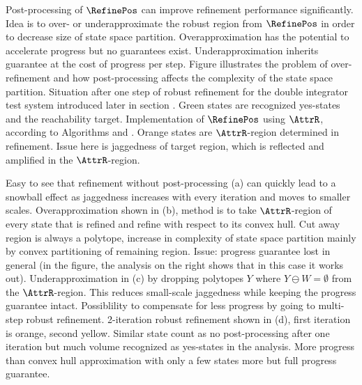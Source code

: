     Post-processing of $\RefinePos$ can improve refinement performance significantly.
    Idea is to over- or underapproximate the robust region from $\RefinePos$ in order to decrease size of state space partition.
    Overapproximation has the potential to accelerate progress but no guarantees exist.
    Underapproximation inherits guarantee at the cost of progress per step.
    Figure  illustrates the problem of over-refinement and how post-processing affects the complexity of the state space partition.
    Situation after one step of robust refinement for the double integrator test system introduced later in section .
    Green states are recognized yes-states and the reachability target.
    Implementation of $\RefinePos$ using $\AttrR$, according to Algorithms  and .
    Orange states are $\AttrR$-region determined in refinement.
    Issue here is jaggedness of target region, which is reflected and amplified in the $\AttrR$-region.

    Easy to see that refinement without post-processing (a) can quickly lead to a snowball effect as jaggedness increases with every iteration and moves to smaller scales.
    Overapproximation shown in (b), method is to take $\AttrR$-region of every state that is refined and refine with respect to its convex hull.
    Cut away region is always a polytope, increase in complexity of state space partition mainly by convex partitioning of remaining region.
    Issue: progress guarantee lost in general (in the figure, the analysis on the right shows that in this case it works out).
    Underapproximation in (c) by dropping polytopes $Y$ where $Y \ominus W = \emptyset$ from the $\AttrR$-region.
    This reduces small-scale jaggedness while keeping the progress guarantee intact.
    Possiblility to compensate for less progress by going to multi-step robust refinement.
    2-iteration robust refinement shown in (d), first iteration is orange, second yellow.
    Similar state count as no post-processing after one iteration but much volume recognized as yes-states in the analysis.
    More progress than convex hull approximation with only a few states more but full progress guarantee.

\stopsubsection


\startsubsection[title={Layered Robust Reachability Refinement},reference=sec:refinement-transition-layered]

